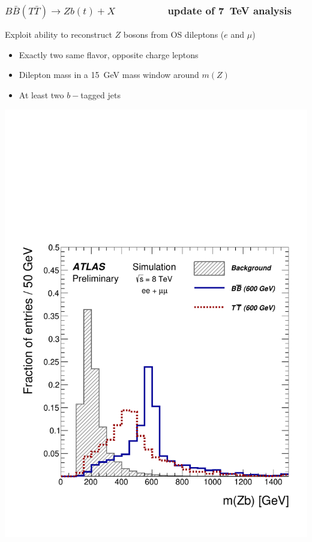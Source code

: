 \documentclass[xcolor=dvipsnames,10pt]{beamer}
\begin{document}
\begin{frame}\frametitle{$B\bar{B}(T\bar{T})\to Zb(t)+X$~\cite{ATLAS-CONF-2013-056} \small $\qquad\qquad$ update of 7~TeV analysis~\cite{:2012aka}}
\footnotesize\centering

Exploit ability to reconstruct $Z$ bosons from OS dileptons ($e$ and $\mu$)


\myskip
\begin{minipage}{.6\textwidth}
\centering

\begin{minipage}{.45\textwidth}

\scriptsize
\centering

\begin{itemize}
\item Exactly two same flavor, opposite charge leptons
\item Dilepton mass in a 15~GeV mass window around $m(Z)$
\item At least two $b-$tagged jets
\end{itemize}

\includegraphics[width=1.1\textwidth]{ztag/fig_03d}
\end{minipage}\begin{minipage}{.55\textwidth}\centering


\end{minipage}
\end{minipage}
\end{frame}
\end{document}

